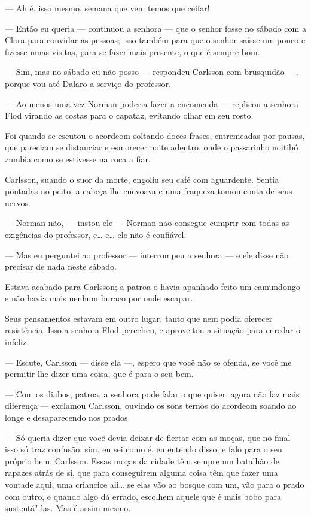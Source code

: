 --- Ah é, isso mesmo, semana que vem temos que ceifar!

--- Então eu queria --- continuou a senhora --- que o senhor fosse no sábado com a
Clara para convidar as pessoas; isso também para que o senhor saísse um pouco 
e fizesse umas visitas, para se fazer mais presente, o que é sempre bom.

--- Sim, mas no sábado eu não posso --- respondeu Carlsson com brusquidão ---,
porque vou até Dalarö a serviço do professor.

--- Ao menos uma vez Norman poderia fazer a encomenda --- replicou a senhora Flod
virando as costas para o capataz, evitando olhar em seu rosto.

Foi quando se escutou o acordeom soltando doces frases, entremeadas por pausas,
que pareciam se distanciar e esmorecer noite adentro, onde o passarinho
noitibó zumbia como se estivesse na roca a fiar.

Carlsson, suando o suor da morte, engoliu seu café com aguardente. Sentia pontadas
no peito, a cabeça lhe enevoava e uma fraqueza tomou conta de seus nervos.

--- Norman não, --- instou ele --- Norman não consegue cumprir com todas as
exigências do professor, e\ldots{} e\ldots{} ele não é confiável.

--- Mas eu perguntei ao professor --- interrompeu a senhora --- e ele disse não
precisar de nada neste sábado.

Estava acabado para Carlsson; a patroa o havia apanhado feito um camundongo e
não havia mais nenhum buraco por onde escapar.

Seus pensamentos estavam em outro lugar, tanto que nem podia oferecer
resistência. Isso a senhora Flod percebeu, e aproveitou a situação para enredar
o infeliz.

--- Escute, Carlsson --- disse ela ---, espero que você não se ofenda, se você me
permitir lhe dizer uma coisa, que é para o seu bem.

--- Com os diabos, patroa, a senhora pode falar o que quiser, agora não faz mais diferença ---
exclamou Carlsson, ouvindo os sons ternos do acordeom soando ao longe e
desaparecendo nos prados.

--- Só queria dizer que você devia deixar de flertar com as moças, que
no final isso só traz confusão; sim, eu sei como é, eu entendo disso; e falo para o seu
próprio bem, Carlsson. Essas moças da cidade têm sempre um batalhão de
rapazes atrás de si, que para conseguirem alguma coisa têm que fazer uma vontade aqui,
uma criancice ali\ldots{} se elas vão ao bosque com um, vão para o prado com outro, e
quando algo dá errado, escolhem aquele que é mais bobo para sustentá"-las.
Mas é assim mesmo.

